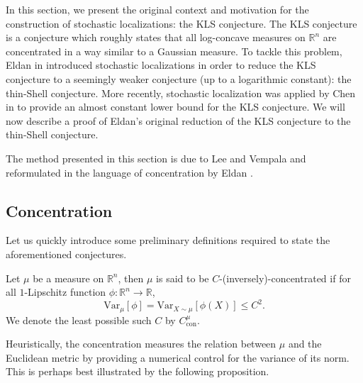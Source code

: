 In this section, we present the original context and motivation for the construction of stochastic 
localizations: the KLS conjecture. The KLS conjecture is a conjecture which roughly states that all 
log-concave measures on \(\mathbb{R}^n\) are concentrated in a way similar to a Gaussian measure. 
To tackle this problem, Eldan in \cite{Eldan_2013} introduced stochastic localizations  
in order to reduce the KLS conjecture to a seemingly weaker conjecture (up to a logarithmic constant): 
the thin-Shell conjecture. More recently, stochastic localization was applied by Chen in \cite{Chen_2020} 
to provide an almost constant lower bound for the KLS conjecture. We will now describe 
a proof of Eldan's original reduction of the KLS conjecture to the thin-Shell conjecture.

The method presented in this section is due to Lee and Vempala \cite{Lee_2016} and reformulated in 
the language of concentration by Eldan \cite{Eldan_notes}.

\subsection{Concentration}

Let us quickly introduce some preliminary definitions required to state the aforementioned conjectures. 

\begin{definition}
  Let \(\mu\) be a measure on \(\mathbb{R}^n\), then \(\mu\) is said to be \(C\)-(inversely)-concentrated if
  for all \(1\)-Lipschitz function \(\phi : \mathbb{R}^n \to \mathbb{R}\), 
  \begin{equation}
    \text{Var}_\mu[\phi] = \text{Var}_{X \sim \mu}[\phi(X)] \le C^2.
  \end{equation}
  We denote the least possible such \(C\) by \(C^\mu_{\text{con}}\).
\end{definition}

Heuristically, the concentration measures the relation between \(\mu\) and the Euclidean metric by 
providing a numerical control for the variance of its norm. This is perhaps best illustrated by the following proposition.

